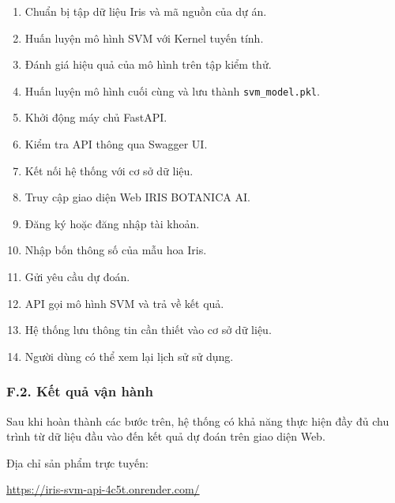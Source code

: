 \documentclass[14pt]{extarticle}
\begin{document}
	\begin{enumerate}[leftmargin=*]
		
		\item Chuẩn bị tập dữ liệu Iris và mã nguồn của dự án.
		
		\item Huấn luyện mô hình SVM với Kernel tuyến tính.
		
		\item Đánh giá hiệu quả của mô hình trên tập kiểm thử.
		
		\item Huấn luyện mô hình cuối cùng và lưu thành
		\texttt{svm\_model.pkl}.
		
		\item Khởi động máy chủ FastAPI.
		
		\item Kiểm tra API thông qua Swagger UI.
		
		\item Kết nối hệ thống với cơ sở dữ liệu.
		
		\item Truy cập giao diện Web IRIS BOTANICA AI.
		
		\item Đăng ký hoặc đăng nhập tài khoản.
		
		\item Nhập bốn thông số của mẫu hoa Iris.
		
		\item Gửi yêu cầu dự đoán.
		
		\item API gọi mô hình SVM và trả về kết quả.
		
		\item Hệ thống lưu thông tin cần thiết vào cơ sở dữ liệu.
		
		\item Người dùng có thể xem lại lịch sử sử dụng.
		
	\end{enumerate}
	
	\subsubsection*{F.2. Kết quả vận hành}
	
	\noindent
	Sau khi hoàn thành các bước trên, hệ thống có khả năng thực hiện đầy đủ
	chu trình từ dữ liệu đầu vào đến kết quả dự đoán trên giao diện Web.
	
	
	\noindent
	Địa chỉ sản phẩm trực tuyến:
	
	\begin{center}
		\url{https://iris-svm-api-4c5t.onrender.com/}
	\end{center}
	
\end{document}
